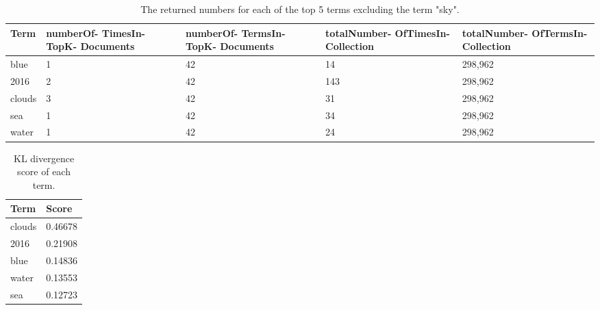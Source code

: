 \begin{table}
	\centering
    \begin{tabular}{|l|p{22mm}|p{22mm}|p{25mm}|p{25mm}|}
		\hline
    \textbf{Term}   & \textbf{numberOf- \newline TimesIn- \newline TopK- \newline Documents} &
		\textbf{numberOf- \newline TermsIn- \newline TopK- \newline Documents} &
		\textbf{totalNumber- \newline OfTimesIn- \newline Collection} &
		\textbf{totalNumber- \newline OfTermsIn- \newline Collection} \\ \hline
    blue   & 1                            & 42                           & 14                             & 298,962                         \\ \hline
    2016   & 2                            & 42                           & 143                            & 298,962                         \\ \hline
    clouds & 3                            & 42                           & 31                             & 298,962                         \\ \hline
    sea    & 1                            & 42                           & 34                             & 298,962                         \\ \hline
    water  & 1                            & 42                           & 24                             & 298,962                         \\ \hline
\end{tabular}
	\caption{The returned numbers for each of the top 5 terms excluding the term "sky".}
	\label{tbl:kl-counts}
\end{table}

\begin{table}
	\centering
    \begin{tabular}{|l|l|}
		\hline
    \textbf{Term}   & \textbf{Score}   \\ \hline
    clouds & 0.46678 \\ \hline
    2016   & 0.21908 \\ \hline
    blue   & 0.14836 \\ \hline
    water  & 0.13553 \\ \hline
    sea    & 0.12723 \\ \hline
    \end{tabular}
	\caption{KL divergence score of each term.}
	\label{tbl:kl-score}
\end{table}
